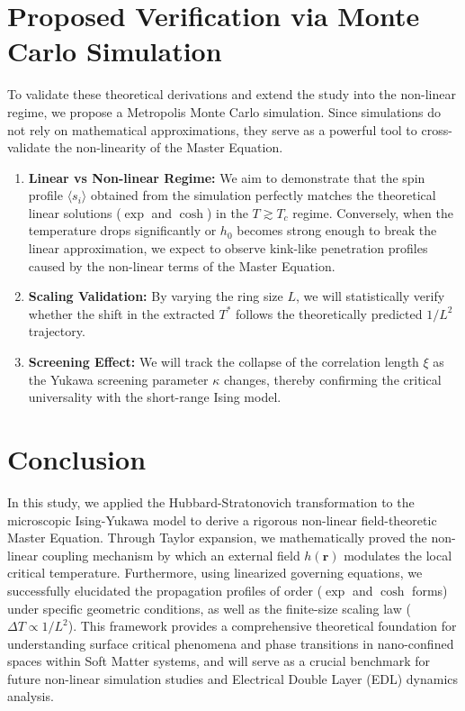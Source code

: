 \documentclass[12pt,a4paper]{article}
\begin{document}
\section{Proposed Verification via Monte Carlo Simulation}
To validate these theoretical derivations and extend the study into the non-linear regime, we propose a Metropolis Monte Carlo simulation. Since simulations do not rely on mathematical approximations, they serve as a powerful tool to cross-validate the non-linearity of the Master Equation.
\begin{enumerate}
    \item \textbf{Linear vs Non-linear Regime:} We aim to demonstrate that the spin profile $\langle s_i \rangle$ obtained from the simulation perfectly matches the theoretical linear solutions ($\exp$ and $\cosh$) in the $T \gtrsim T_c$ regime. Conversely, when the temperature drops significantly or $h_0$ becomes strong enough to break the linear approximation, we expect to observe kink-like penetration profiles caused by the non-linear terms of the Master Equation.
    \item \textbf{Scaling Validation:} By varying the ring size $L$, we will statistically verify whether the shift in the extracted $T^*$ follows the theoretically predicted $1/L^2$ trajectory.
    \item \textbf{Screening Effect:} We will track the collapse of the correlation length $\xi$ as the Yukawa screening parameter $\kappa$ changes, thereby confirming the critical universality with the short-range Ising model.
\end{enumerate}

\section{Conclusion}
In this study, we applied the Hubbard-Stratonovich transformation to the microscopic Ising-Yukawa model to derive a rigorous non-linear field-theoretic Master Equation. Through Taylor expansion, we mathematically proved the non-linear coupling mechanism by which an external field $h(\mathbf{r})$ modulates the local critical temperature. Furthermore, using linearized governing equations, we successfully elucidated the propagation profiles of order ($\exp$ and $\cosh$ forms) under specific geometric conditions, as well as the finite-size scaling law ($\Delta T \propto 1/L^2$). 
This framework provides a comprehensive theoretical foundation for understanding surface critical phenomena and phase transitions in nano-confined spaces within Soft Matter systems, and will serve as a crucial benchmark for future non-linear simulation studies and Electrical Double Layer (EDL) dynamics analysis.
\end{document}
